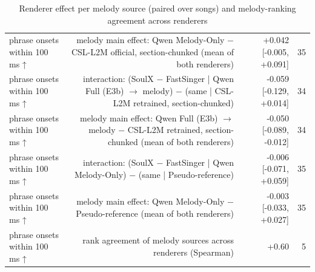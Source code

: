 \begin{table}[t]
\begin{tabular}{lrrr}
phrase onsets within 100 ms ↑ & melody main effect: Qwen Melody-Only $-$ CSL-L2M official, section-chunked (mean of both renderers) & +0.042 [-0.005, +0.091] & 35 \\
phrase onsets within 100 ms ↑ & interaction: (SoulX $-$ FastSinger | Qwen Full (E3b) $\rightarrow$ melody) $-$ (same | CSL-L2M retrained, section-chunked) & -0.059 [-0.129, +0.014] & 34 \\
phrase onsets within 100 ms ↑ & melody main effect: Qwen Full (E3b) $\rightarrow$ melody $-$ CSL-L2M retrained, section-chunked (mean of both renderers) & -0.050 [-0.089, -0.012] & 34 \\
phrase onsets within 100 ms ↑ & interaction: (SoulX $-$ FastSinger | Qwen Melody-Only) $-$ (same | Pseudo-reference) & -0.006 [-0.071, +0.059] & 35 \\
phrase onsets within 100 ms ↑ & melody main effect: Qwen Melody-Only $-$ Pseudo-reference (mean of both renderers) & -0.003 [-0.033, +0.027] & 35 \\
phrase onsets within 100 ms ↑ & rank agreement of melody sources across renderers (Spearman) & +0.60 & 5 \\
\bottomrule
\end{tabular}
\caption{Renderer effect per melody source (paired over songs) and melody-ranking agreement across renderers}
\label{tab:svs_effects}
\end{table}
